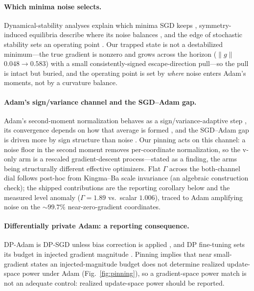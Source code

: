 \documentclass[10pt]{article}
\begin{document}
\paragraph{Which minima noise selects.}
Dynamical-stability analyses explain which minima SGD keeps \citep{wumae},
symmetry-induced equilibria describe where its noise balances \citep{ziyin}, and
the edge of stochastic stability sets an operating point \citep{eoss}. Our trapped
state is not a destabilized minimum---the true gradient is nonzero and grows
across the horizon ($\|g\|$ $0.048\!\to\!0.583$) with a small consistently-signed
escape-direction pull---so the pull is intact but buried, and the operating point
is set by \emph{where} noise enters Adam's moments, not by a curvature balance.

\paragraph{Adam's sign/variance channel and the SGD--Adam gap.}
Adam's second-moment normalization behaves as a sign/variance-adaptive step
\citep{adam,balleshennig}, its convergence depends on how that average is formed
\citep{amsgrad}, and the SGD--Adam gap is driven more by sign structure than noise
\citep{kunstner}. Our pinning acts on this channel: a noise floor in the second
moment removes per-coordinate normalization, so the v-only arm is a rescaled
gradient-descent process---stated as a finding, the arms being structurally
different effective optimizers. Flat $\Gamma$ across the both-channel dial follows
post-hoc from Kingma--Ba scale invariance (an algebraic construction check); the
shipped contributions are the reporting corollary below and the measured level
anomaly ($\Gamma=1.89$ vs.\ scalar $1.006$), traced to Adam amplifying noise on the
${\sim}99.7\%$ near-zero-gradient coordinates.

\paragraph{Differentially private Adam: a reporting consequence.}
DP-Adam is DP-SGD unless bias correction is applied \citep{dpadambc}, and DP
fine-tuning sets its budget in injected gradient magnitude \citep{litramer}.
Pinning implies that near small-gradient states an injected-magnitude budget does
not determine realized update-space power under Adam (Fig.~\ref{fig:pinning}), so
a gradient-space power match is not an adequate control: realized update-space
power should be reported.
\end{document}
